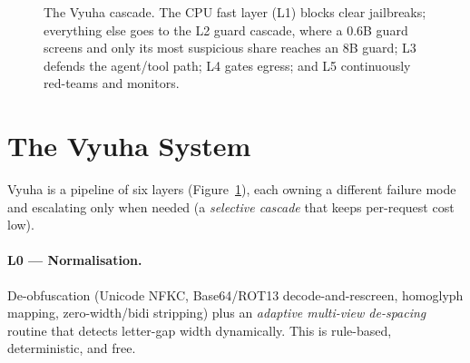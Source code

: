 \documentclass[11pt]{article}
\begin{document}
\begin{figure}[t]
\centering
{}
\caption{The Vyuha cascade. The CPU fast layer (L1) blocks clear jailbreaks; everything else goes to
the L2 guard cascade, where a 0.6B guard screens and only its most suspicious share reaches an 8B guard;
L3 defends the agent/tool path; L4 gates
egress; and L5 continuously red-teams and monitors.}
\label{fig:arch}
\end{figure}

\section{The Vyuha System}
Vyuha is a pipeline of six layers (Figure~\ref{fig:arch}), each owning a different failure mode and
escalating only when needed (a \emph{selective cascade} that keeps per-request cost low).

\paragraph{L0 --- Normalisation.} De-obfuscation (Unicode NFKC, Base64/ROT13 decode-and-rescreen,
homoglyph mapping, zero-width/bidi stripping) plus an \emph{adaptive multi-view de-spacing} routine
that detects letter-gap width dynamically. This is rule-based, deterministic, and free.
\end{document}
